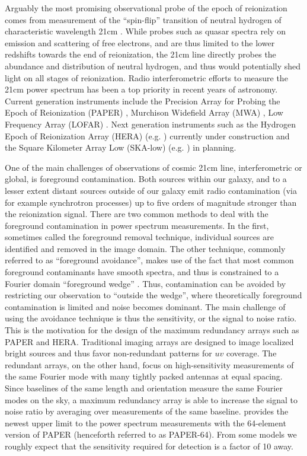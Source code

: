 \documentclass[twocolumn,apj,numberedappendix]{emulateapj}
\renewcommand\[{\begin{equation}}
\renewcommand\]{\end{equation}}
\begin{document}
Arguably the most promising observational probe of the epoch of reionization
comes from measurement of the ``spin-flip'' transition of neutral
hydrogen of characteristic wavelength 21cm \citep{Furlanetto2006181,PritchardLoeb}.
While probes such as quasar spectra rely on emission and scattering
of free electrons, and are thus limited to the lower redshifts towards the end of reionization, the 21cm line directly probes the
abundance and distribution of neutral hydrogen, and thus would potentially
shed light on all stages of reionization. Radio interferometric efforts
to measure the 21cm power spectrum has been a top priority in recent years of astronomy.
Current generation instruments include the Precision Array for Probing
the Epoch of Reionization (PAPER) \citep{Ali2015,paper32}, Murchison
Widefield Array (MWA) \citep{Bowman2013, Tingay2013}, Low Frequency Array (LOFAR) \citep{LOFAR}. Next generation instruments such as the Hydrogen Epoch of Reionization
Array (HERA) (e.g. \citealt{HERA,HERAconfiguration,HERABEAM1,HERADISH2}) currently under construction
and the Square Kilometer Array Low (SKA-low) (e.g. \citealt{SKA1}) in planning. 

One of the main challenges of observations of cosmic
21cm line, interferometric or global, is foreground contamination. Both sources within our
galaxy, and to a lesser extent distant sources outside of our galaxy emit
radio contamination (via for example synchrotron processes) up to five orders of magnitude stronger than the
reionization signal. There are two common methods to deal with the
foreground contamination in power spectrum measurements. In the first, sometimes called the foreground
removal technique, individual sources are identified and removed in the image domain.
The other technique, commonly referred to as ``foreground avoidance'',
makes use of the fact that most common foreground contaminants have smooth
spectra, and thus is constrained to a Fourier domain ``foreground
wedge'' \citep{wedge1,wedge2}. Thus, contamination can be avoided
by restricting our observation to ``outside the wedge'', where theoretically foreground contamination is limited and noise becomes dominant. The main
challenge of using the avoidance technique is thus the sensitivity, or
the signal to noise ratio. This is the motivation for the design of
the maximum redundancy arrays such as PAPER and HERA. Traditional
imaging arrays are designed to image localized bright sources and thus favor non-redundant patterns for $uv$ coverage. The redundant arrays, on the other hand,
focus on high-sensitivity measurements of the same Fourier mode
with many tightly packed antennas at equal spacing. Since baselines
of the same length and orientation measure the same Fourier modes
on the sky, a maximum redundancy array is able to increase the
signal to noise ratio by averaging over measurements of the same baseline.
\cite{Ali2015} provides the newest upper limit to the power spectrum
measurements with the 64-element version of PAPER (henceforth referred to as PAPER-64). From some models we roughly expect
that the sensitivity required for detection is a factor of 10 away.
\end{document}
